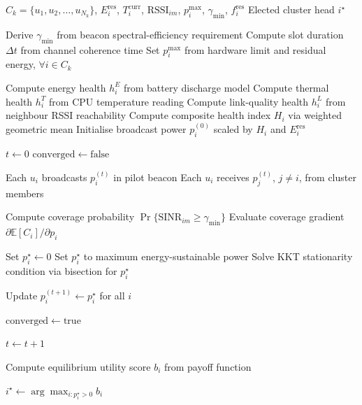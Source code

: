 \documentclass[journal]{IEEEtran}
\begin{document}
\begin{algorithm}[t]
\caption{CH Election Game}
\label{alg:ch-election-game}
\begin{algorithmic}[1]

\Require 
$C_k=\{u_1,u_2,\ldots,u_{N_k}\}$, 
$E_i^{\mathrm{res}}$, 
$T_i^{\mathrm{curr}}$, 
$\mathrm{RSSI}_{im}$, 
$p_i^{\max}$, 
$\gamma_{\min}$, 
$f_i^{\mathrm{res}}$
\Ensure Elected cluster head $i^{\star}$

\State Derive $\gamma_{\min}$ from beacon spectral-efficiency requirement
\State Compute slot duration $\Delta t$ from channel coherence time
\State Set $p_i^{\max}$ from hardware limit and residual energy, $\forall i \in C_k$

    \State Compute energy health $h_i^{E}$ from battery discharge model
    \State Compute thermal health $h_i^{T}$ from CPU temperature reading
    \State Compute link-quality health $h_i^{L}$ from neighbour RSSI reachability
    \State Compute composite health index $H_i$ via weighted geometric mean
    \State Initialise broadcast power $p_i^{(0)}$ scaled by $H_i$ and $E_i^{\mathrm{res}}$
\EndFor

\State $t \gets 0$
\State $\mathrm{converged} \gets \mathrm{false}$

    \State Each $u_i$ broadcasts $p_i^{(t)}$ in pilot beacon
    \State Each $u_i$ receives $p_j^{(t)}$, $j\neq i$, from cluster members

        \State Compute coverage probability $\Pr\{\mathrm{SINR}_{im} \geq \gamma_{\min}\}$
        \State Evaluate coverage gradient $\partial \mathbb{E}[C_i]/\partial p_i$

            \State Set $p_i^{\star} \gets 0$ 
            \State Set $p_i^{\star}$ to maximum energy-sustainable power
        \Else
            \State Solve KKT stationarity condition via bisection for $p_i^{\star}$
        \EndIf
    \EndFor

    \State Update $p_i^{(t+1)} \gets p_i^{\star}$ for all $i$

        \State $\mathrm{converged} \gets \mathrm{true}$
    \EndIf

    \State $t \gets t+1$
\EndWhile

    \State Compute equilibrium utility score $b_i$ from payoff function
\EndFor

\State \Return $i^{\star} \gets \arg\max_{i:p_i^{\star}>0} b_i$

\end{algorithmic}
\end{algorithm}
\end{document}
